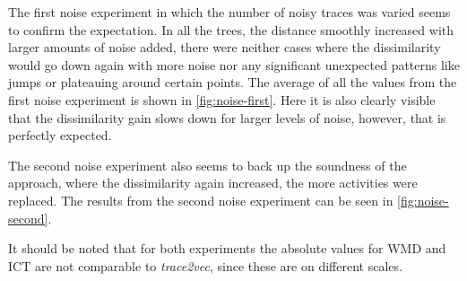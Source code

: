 \documentclass[runningheads]{template/llncs}
\begin{document}
The first noise experiment in which the number of noisy traces was varied seems to confirm the expectation.
In all the trees, the distance smoothly increased with larger amounts of noise added, there were neither cases where the dissimilarity would go down again with more noise nor any significant unexpected patterns like jumps or plateauing around certain points.
The average of all the values from the first noise experiment is shown in \cref{fig:noise-first}.
Here it is also clearly visible that the dissimilarity gain slows down for larger levels of noise, however, that is perfectly expected. 

The second noise experiment also seems to back up the soundness of the approach, where the dissimilarity again increased, the more activities were replaced.
The results from the second noise experiment can be seen in \cref{fig:noise-second}.

It should be noted that for both experiments the absolute values for WMD and ICT are not comparable to \emph{trace2vec}, since these are on different scales.
\end{document}
